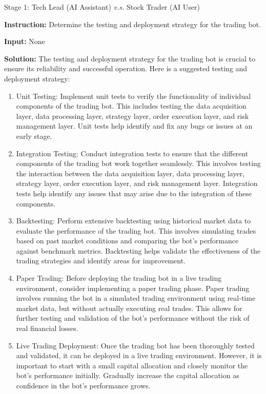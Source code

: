 \begin{AIBoxBreak}{Stage 1: Tech Lead (AI Assistant) \textit{v.s.} Stock Trader (AI User)}
\usermsg

\textbf{Instruction:} Determine the testing and deployment strategy for the trading bot.

\textbf{Input:} None


\assistantmsg

\textbf{Solution:} The testing and deployment strategy for the trading bot is crucial to ensure its reliability and successful operation. Here is a suggested testing and deployment strategy:

\begin{enumerate}
\item  Unit Testing: Implement unit tests to verify the functionality of individual components of the trading bot. This includes testing the data acquisition layer, data processing layer, strategy layer, order execution layer, and risk management layer. Unit tests help identify and fix any bugs or issues at an early stage.

\item  Integration Testing: Conduct integration tests to ensure that the different components of the trading bot work together seamlessly. This involves testing the interaction between the data acquisition layer, data processing layer, strategy layer, order execution layer, and risk management layer. Integration tests help identify any issues that may arise due to the integration of these components.

\item  Backtesting: Perform extensive backtesting using historical market data to evaluate the performance of the trading bot. This involves simulating trades based on past market conditions and comparing the bot’s performance against benchmark metrics. Backtesting helps validate the effectiveness of the trading strategies and identify areas for improvement.

\item  Paper Trading: Before deploying the trading bot in a live trading environment, consider implementing a paper trading phase. Paper trading involves running the bot in a simulated trading environment using real-time market data, but without actually executing real trades. This allows for further testing and validation of the bot’s performance without the risk of real financial losses.

\item  Live Trading Deployment: Once the trading bot has been thoroughly tested and validated, it can be deployed in a live trading environment. However, it is important to start with a small capital allocation and closely monitor the bot’s performance initially. Gradually increase the capital allocation as confidence in the bot’s performance grows.


\end{enumerate}
\end{AIBoxBreak}
